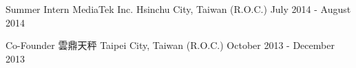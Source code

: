 \begin{cventries}
  \cventry
    {Summer Intern} %
    {MediaTek Inc.} %
    {Hsinchu City, Taiwan (R.O.C.)} %
    {July 2014 - August 2014} %
    {
      \begin{cvitems} %
      \end{cvitems}
    }

  \cventry
    {Co-Founder} %
    {雲鼎天秤} %
    {Taipei City, Taiwan (R.O.C.)} %
    {October 2013 - December 2013} %
    {
      \begin{cvitems} %
      \end{cvitems}
    }

\end{cventries}
